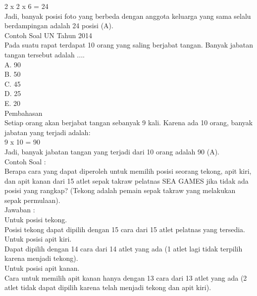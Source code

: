 \documentclass[11pt,fleqn]{book} %
\begin{document}
2 x 2 x 6 = 24\\

Jadi, banyak posisi foto yang berbeda dengan anggota keluarga yang sama selalu berdampingan adalah 24 posisi (A). \\

Contoh Soal UN Tahun 2014 \\
Pada suatu rapat terdapat 10 orang yang saling berjabat tangan. Banyak jabatan tangan tersebut adalah ....\\

A.   90\\
B.   50\\
C.   45\\
D.   25\\
E.   20\\


Pembahasan\\
Setiap orang akan berjabat tangan sebanyak 9 kali. Karena ada 10 orang, banyak jabatan yang terjadi adalah:\\

9 x 10 = 90\\

Jadi, banyak jabatan tangan yang terjadi dari 10 orang  adalah 90 (A).\\


Contoh Soal :\\

Berapa cara yang dapat diperoleh untuk memilih posisi seorang tekong, apit kiri, dan apit kanan dari 15 atlet sepak takraw pelatnas SEA GAMES jika tidak ada posisi yang rangkap? (Tekong adalah pemain sepak takraw yang melakukan sepak permulaan).\\

Jawaban :\\

Untuk posisi tekong.\\

Posisi tekong dapat dipilih dengan 15 cara dari 15 atlet pelatnas yang tersedia.\\

Untuk posisi apit kiri.\\

Dapat dipilih dengan 14 cara dari 14 atlet yang ada (1 atlet lagi tidak terpilih karena menjadi tekong).\\

Untuk posisi apit kanan.\\

Cara untuk memilih apit kanan hanya dengan 13 cara dari 13 atlet yang ada (2 atlet tidak dapat dipilih karena telah menjadi tekong dan apit kiri).\\
\end{document}
